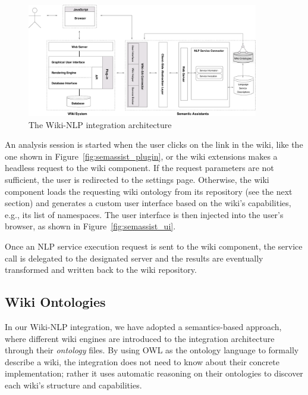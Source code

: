 \begin{figure}
\centering
\includegraphics[width=0.9\textwidth]{pictures/wikinlp_arch}
\caption{The Wiki-NLP integration architecture}
\label{fig:wikinlp_arch}
\end{figure}

An analysis session is started when the user clicks on the \sa link in the wiki, like the one shown in Figure~\ref{fig:semassist_plugin}, or the wiki extensions makes a headless request to the wiki component. If the request parameters are not sufficient, the user is redirected to the settings page. Otherwise, the wiki component loads the requesting wiki ontology from its repository (see the next section) and generates a custom user interface based on the wiki's capabilities, e.g., its list of namespaces. The user interface is then injected into the user's browser, as shown in Figure~\ref{fig:semassist_ui}.

Once an NLP service execution request is sent to the wiki component, the service call is delegated to the designated \sa server and the results are eventually transformed and written back to the wiki repository.

\subsection{Wiki Ontologies}
In our Wiki-NLP integration, we have adopted a semantics-based approach, where different wiki engines are introduced to the integration architecture through their \emph{ontology} files. By using OWL as the ontology language to formally describe a wiki, the integration does not need to know about their concrete implementation; rather it uses automatic reasoning on their ontologies to discover each wiki's structure and capabilities.

